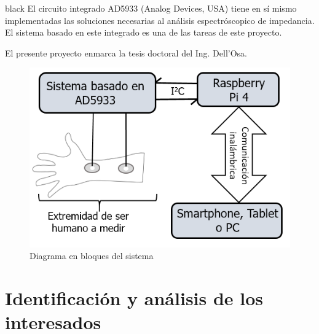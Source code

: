 \documentclass[11pt]{charter}
\begin{document}
\begin{consigna}{black}
El circuito integrado AD5933 (Analog Devices, USA) tiene en sí mismo implementadas las soluciones necesarias al análisis espectróscopico de impedancia. El sistema basado en este integrado es una de las tareas de este proyecto.

El presente proyecto enmarca la tesis doctoral del Ing. Dell’Osa.

\vspace{25px}

\begin{figure}[H]
\centering 
\includegraphics[width=.7\textwidth]{./Figuras/diagBloques_def.png}
\caption{Diagrama en bloques del sistema}
\label{fig:diagBloques}
\end{figure}

\vspace{25px}
\end{consigna}

\pagebreak

\section{Identificación y análisis de los interesados}
\label{sec:interesados}
\end{document}
